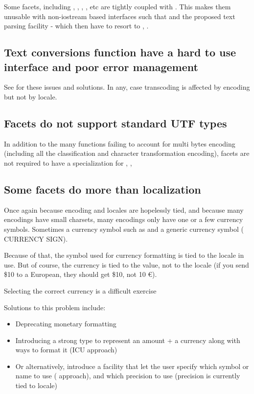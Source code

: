 \documentclass{wg21}
\newcommand{\UnicodeLetter}[1]{\textbf{\textcolor{BrickRed}{\Large\tcode{#1}}}}
\begin{document}
Some facets, including , , , , etc are tightly coupled with .
This makes them unusable with non-iostream based interfaces such that  and the proposed text parsing facility \cite{P1729R1} - which then have to resort to , .

\subsection{Text conversions function have a hard to use interface and poor error management}

See \cite{P1629R0} for these issues and solutions.
In any, case transcoding is affected by encoding but not by locale.
\subsection{Facets do not support standard UTF types}

In addition to the many functions failing to account for multi bytes encoding (including all the classification and character transformation encoding), facets are not required to have a specialization for , , 

\subsection{Some facets do more than localization}
Once again because encoding and locales are hopelessly tied, and because many encodings have small charsets, many encodings only have one or a few currency symbols. Sometimes a currency symbol such as \UnicodeLetter{\$} and a generic currency symbol (\UnicodeLetter{¤} CURRENCY SIGN).

Because of that, the symbol used for currency formatting is tied to the locale in use.
But of course, the currency is tied to the value, not to the locale (if you send \$10 to a European, they should get \$10, not 10 €).

Selecting the correct currency is a difficult exercise \cite{Stackoverflow}

Solutions to this problem include:

\begin{itemize}
    \item Deprecating monetary formatting
    \item Introducing a strong type to represent an amount + a currency along with ways to format it (ICU approach)
    \item Or alternatively, introduce a facility that let the user specify which symbol or name to use (\cite{QLocale} approach), and which precision to use (precision is currently tied to locale)
\end{itemize}
\end{document}
